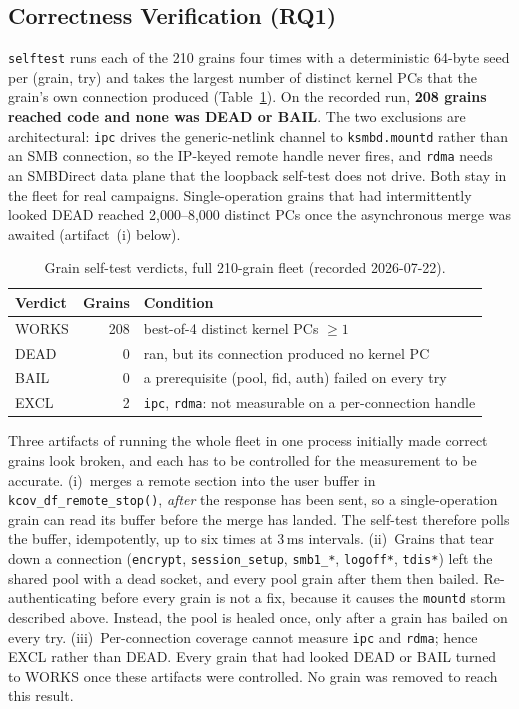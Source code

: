 \documentclass{article}
\begin{document}
\subsection{Correctness Verification (RQ1)}

\texttt{selftest} runs each of the 210 grains four times with a
deterministic 64-byte seed per (grain, try) and takes the largest number of
distinct kernel PCs that the grain's own connection produced
(Table~\ref{tab:selftest}). On the recorded run, \textbf{208 grains reached
\ksmbd code and none was DEAD or BAIL}. The two exclusions are architectural:
\texttt{ipc} drives the generic-netlink channel to \texttt{ksmbd.mountd}
rather than an SMB connection, so the IP-keyed remote handle never fires, and
\texttt{rdma} needs an SMBDirect data plane that the loopback self-test does
not drive. Both stay in the fleet for real campaigns. Single-operation
grains that had intermittently looked DEAD reached 2{,}000--8{,}000 distinct
PCs once the asynchronous merge was awaited (artifact~(i) below).

\begin{table}[t]
\centering
\caption{Grain self-test verdicts, full 210-grain fleet (recorded
2026-07-22).}\label{tab:selftest}
\small
\begin{tabular}{@{}lrl@{}}
\toprule
\textbf{Verdict} & \textbf{Grains} & \textbf{Condition} \\
\midrule
WORKS & 208 & best-of-4 distinct kernel PCs $\geq 1$ \\
DEAD  & 0   & ran, but its connection produced no kernel PC \\
BAIL  & 0   & a prerequisite (pool, fid, auth) failed on every try \\
EXCL  & 2   & \texttt{ipc}, \texttt{rdma}: not measurable on a per-connection handle \\
\bottomrule
\end{tabular}
\end{table}

Three artifacts of running the whole fleet in one process initially made
correct grains look broken, and each has to be controlled for the
measurement to be accurate.
(i)~\ksmbd merges a remote section into the user buffer in
\texttt{kcov\_df\_remote\_stop()}, \emph{after} the response has been sent,
so a single-operation grain can read its buffer before the merge has landed.
The self-test therefore polls the buffer, idempotently, up to six times at
3\,ms intervals.
(ii)~Grains that tear down a connection (\texttt{encrypt},
\texttt{session\_setup}, \texttt{smb1\_*}, \texttt{logoff*}, \texttt{tdis*})
left the shared pool with a dead socket, and every pool grain after them then
bailed. Re-authenticating before every grain is not a fix, because it causes
the \texttt{mountd} storm described above. Instead, the pool is healed once,
only after a grain has bailed on every try.
(iii)~Per-connection coverage cannot measure \texttt{ipc} and \texttt{rdma};
hence EXCL rather than DEAD. Every grain that had looked DEAD or BAIL turned
to WORKS once these artifacts were controlled. No grain was removed to reach
this result.
\end{document}
